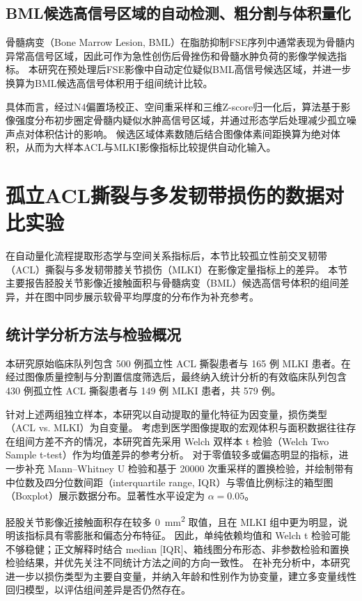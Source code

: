   \subsection{BML候选高信号区域的自动检测、粗分割与体积量化}
    骨髓病变（Bone Marrow Lesion, BML）在脂肪抑制FSE序列中通常表现为骨髓内异常高信号区域，因此可作为急性创伤后骨挫伤和骨髓水肿负荷的影像学候选指标。
    本研究在预处理后FSE影像中自动定位疑似BML高信号候选区域，并进一步换算为BML候选高信号体积用于组间统计比较。
    \par 具体而言，经过N4偏置场校正、空间重采样和三维Z-score归一化后，算法基于影像强度分布初步圈定骨髓内疑似水肿高信号区域，并通过形态学后处理减少孤立噪声点对体积估计的影响。
    候选区域体素数随后结合图像体素间距换算为绝对体积，从而为大样本ACL与MLKI影像指标比较提供自动化输入。

\section{孤立ACL撕裂与多发韧带损伤的数据对比实验}
  在自动量化流程提取形态学与空间关系指标后，本节比较孤立性前交叉韧带（ACL）撕裂与多发韧带膝关节损伤（MLKI）在影像定量指标上的差异。
  本节主要报告胫股关节影像近接触面积与骨髓病变（BML）候选高信号体积的组间差异，并在图中同步展示软骨平均厚度的分布作为补充参考。
  \subsection{统计学分析方法与检验概况}
    本研究原始临床队列包含 500 例孤立性 ACL 撕裂患者与 165 例 MLKI 患者。在经过图像质量控制与分割置信度筛选后，最终纳入统计分析的有效临床队列包含 430 例孤立性 ACL 撕裂患者与 149 例 MLKI 患者，共 \num{579} 例。
    \par 针对上述两组独立样本，本研究以自动提取的量化特征为因变量，损伤类型（ACL vs. MLKI）为自变量。
    考虑到医学图像提取的宏观体积与面积数据往往存在组间方差不齐的情况，本研究首先采用 Welch 双样本 t 检验（Welch Two Sample t-test）作为均值差异的参考分析。
    对于零值较多或偏态明显的指标，进一步补充 Mann--Whitney U 检验和基于 \num{20000} 次重采样的置换检验，并绘制带有中位数及四分位数间距（interquartile range, IQR）与零值比例标注的箱型图（Boxplot）展示数据分布。显著性水平设定为 $\alpha=0.05$。
    \par 胫股关节影像近接触面积存在较多 \qty{0}{\square\milli\metre} 取值，且在 MLKI 组中更为明显，说明该指标具有零膨胀和偏态分布特征。
    因此，单纯依赖均值和 Welch t 检验可能不够稳健；正文解释时结合 median [IQR]、箱线图分布形态、非参数检验和置换检验结果，并优先关注不同统计方法之间的方向一致性。
    在补充分析中，本研究进一步以损伤类型为主要自变量，并纳入年龄和性别作为协变量，建立多变量线性回归模型，以评估组间差异是否仍然存在。
